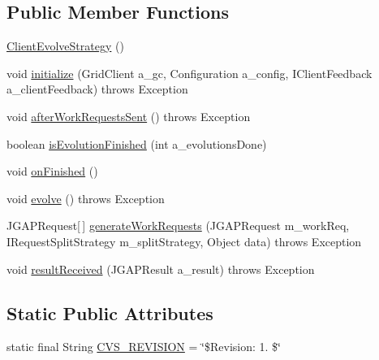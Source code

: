 \subsection*{Public Member Functions}
\begin{DoxyCompactItemize}
\item 
\hyperlink{classexamples_1_1grid_1_1evolution_distributed_1_1_client_evolve_strategy_aa44d8e89dfe9004876577f44aef810fd}{Client\-Evolve\-Strategy} ()
\item 
void \hyperlink{classexamples_1_1grid_1_1evolution_distributed_1_1_client_evolve_strategy_ae22865d0faeb9b0b6833d1ba67379251}{initialize} (Grid\-Client a\-\_\-gc, Configuration a\-\_\-config, I\-Client\-Feedback a\-\_\-client\-Feedback)  throws Exception 
\item 
void \hyperlink{classexamples_1_1grid_1_1evolution_distributed_1_1_client_evolve_strategy_a54eb4417108e38b673ce83aebf34ef65}{after\-Work\-Requests\-Sent} ()  throws Exception 
\item 
boolean \hyperlink{classexamples_1_1grid_1_1evolution_distributed_1_1_client_evolve_strategy_a0313b94e6d068fcdc1fc806d86bdf5f0}{is\-Evolution\-Finished} (int a\-\_\-evolutions\-Done)
\item 
void \hyperlink{classexamples_1_1grid_1_1evolution_distributed_1_1_client_evolve_strategy_a1648e9891cd2f2df568287489ed34542}{on\-Finished} ()
\item 
void \hyperlink{classexamples_1_1grid_1_1evolution_distributed_1_1_client_evolve_strategy_a1d94151504925be6de53753d92b2f269}{evolve} ()  throws Exception 
\item 
J\-G\-A\-P\-Request\mbox{[}$\,$\mbox{]} \hyperlink{classexamples_1_1grid_1_1evolution_distributed_1_1_client_evolve_strategy_a69bdffe66446efa8e6d06e8fcfca7f9b}{generate\-Work\-Requests} (J\-G\-A\-P\-Request m\-\_\-work\-Req, I\-Request\-Split\-Strategy m\-\_\-split\-Strategy, Object data)  throws Exception 
\item 
void \hyperlink{classexamples_1_1grid_1_1evolution_distributed_1_1_client_evolve_strategy_ac6fc406ca744177ffdf69dcf9beadcd8}{result\-Received} (J\-G\-A\-P\-Result a\-\_\-result)  throws Exception 
\end{DoxyCompactItemize}
\subsection*{Static Public Attributes}
\begin{DoxyCompactItemize}
\item 
static final String \hyperlink{classexamples_1_1grid_1_1evolution_distributed_1_1_client_evolve_strategy_a5e78f5941d71c6faf84b588c0f3814da}{C\-V\-S\-\_\-\-R\-E\-V\-I\-S\-I\-O\-N} = \char`\"{}\$Revision\-: 1. \$\char`\"{}
\end{DoxyCompactItemize}
